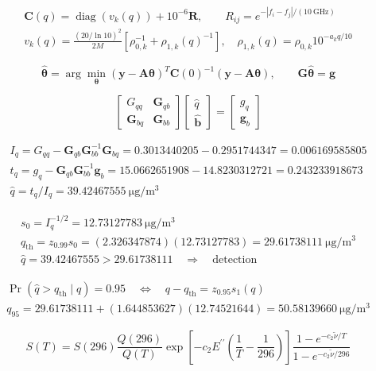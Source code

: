 \documentclass{article}
\begin{document}
\newpage
\[\displaystyle \begin{gathered}\mathbf C(q)=\operatorname{diag}(v_k(q))+10^{-6}\mathbf R,\qquad R_{ij}=e^{-|f_i-f_j|/(10\ \mathrm{GHz})}\\v_k(q)=\frac{(20/\ln10)^2}{2M}\left[\rho_{0,k}^{-1}+\rho_{1,k}(q)^{-1}\right],\quad\rho_{1,k}(q)=\rho_{0,k}10^{-a_kq/10}\end{gathered}\]

\newpage
\[\displaystyle \widehat{\boldsymbol\theta}=\arg\min_{\boldsymbol\theta}(\mathbf y-\mathbf A\boldsymbol\theta)^T\mathbf C(0)^{-1}(\mathbf y-\mathbf A\boldsymbol\theta),\qquad\mathbf G\widehat{\boldsymbol\theta}=\mathbf g\]

\newpage
\[\displaystyle \begin{bmatrix}G_{qq}&\mathbf G_{qb}\\\mathbf G_{bq}&\mathbf G_{bb}\end{bmatrix}\begin{bmatrix}\widehat q\\\widehat{\mathbf b}\end{bmatrix}=\begin{bmatrix}g_q\\\mathbf g_b\end{bmatrix}\]

\newpage
\[\displaystyle \begin{gathered}I_q=G_{qq}-\mathbf G_{qb}\mathbf G_{bb}^{-1}\mathbf G_{bq}=0.3013440205-0.2951744347=0.006169585805\\t_q=g_q-\mathbf G_{qb}\mathbf G_{bb}^{-1}\mathbf g_b=15.0662651908-14.8230312721=0.243233918673\\\widehat q=t_q/I_q=39.42467555\ \mathrm{\mu g/m^3}\end{gathered}\]

\newpage
\[\displaystyle \begin{gathered}s_0=I_q^{-1/2}=12.73127783\ \mathrm{\mu g/m^3}\\q_{\mathrm{th}}=z_{0.99}s_0=(2.326347874)(12.73127783)=29.61738111\ \mathrm{\mu g/m^3}\\\widehat q=39.42467555>29.61738111\quad\Longrightarrow\quad\text{detection}\end{gathered}\]

\newpage
\[\displaystyle \begin{gathered}\Pr(\widehat q>q_{\mathrm{th}}\mid q)=0.95\quad\Longleftrightarrow\quad q-q_{\mathrm{th}}=z_{0.95}s_1(q)\\q_{95}=29.61738111+(1.644853627)(12.74521644)=50.58139660\ \mathrm{\mu g/m^3}\end{gathered}\]

\newpage
\[\displaystyle S(T)=S(296)\frac{Q(296)}{Q(T)}\exp\!\left[-c_2E^{\prime\prime}\left(\frac1T-\frac1{296}\right)\right]\frac{1-e^{-c_2\widetilde\nu/T}}{1-e^{-c_2\widetilde\nu/296}}\]
\end{document}
